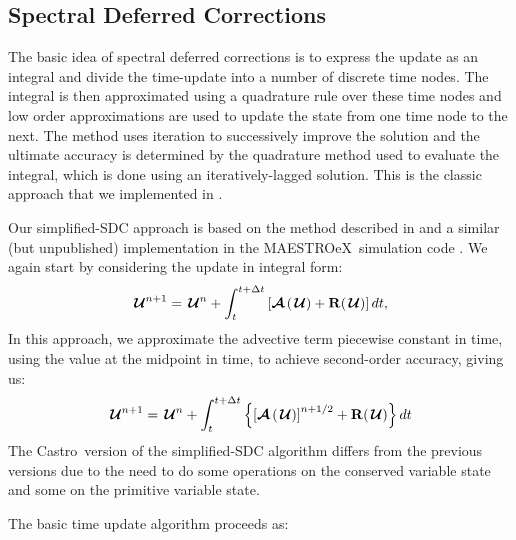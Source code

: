 \documentclass{aastex63}
\newcommand{\castro}{{\sf Castro}}
\newcommand{\maestroex}{{\sf MAESTROeX}}
\newcommand{\Uc}{{\,\bm{\mathcal{U}}}}
\newcommand{\Rb}{{\bf R}}
\newcommand{\Adv}[1]{{\left [\boldsymbol{\mathcal{A}} \left(#1\right)\right]}}
\newcommand{\Advs}[1]{\boldsymbol{\mathcal{A}} \left(#1\right)}
\newcommand{\MarginPar}[1]{\marginpar{\vskip-\baselineskip\raggedright\tiny\sffamily\hrule\smallskip{\color{red}#1}\par\smallskip\hrule}}
\begin{document}
\subsection{Spectral Deferred Corrections}

The basic idea of spectral deferred corrections \MarginPar{ref} is to express the
update as an integral and divide the time-update into a number of
discrete time nodes.  The integral is then approximated using a
quadrature rule over these time nodes and low order approximations are
used to update the state from one time node to the next.  The method
uses iteration to successively improve the solution and the ultimate
accuracy is determined by the quadrature method used to evaluate the
integral, which is done using an iteratively-lagged solution.  This is the
classic approach that we implemented in \cite{castro_sdc}.

Our simplified-SDC approach is based on the method described in \citet{SDC-old} and
a similar (but unpublished) implementation in the \maestroex\ simulation code \cite{maestroex}.
We again start by considering the update
in integral form:
\begin{equation}
\Uc^{n+1} = \Uc^n + \int_t^{t+\Delta t} \left [ \Advs{\Uc} + \Rb(\Uc) \right ] dt,
\end{equation}
In this approach, we 
approximate the advective term
piecewise constant in time, using the value at the midpoint in time,
to achieve second-order accuracy, giving us:
\begin{equation}
\label{eq:integral:simplesdc}
\Uc^{n+1} = \Uc^n + \int_t^{t+\Delta t} \left \{ \Adv{\Uc}^{n+1/2} + \Rb(\Uc) \right \} dt
\end{equation}
The \castro\ version of the simplified-SDC algorithm
differs from the previous versions due to the need to do some operations
on the conserved variable state and some on the primitive variable
state. 

The basic time update algorithm proceeds as:
\end{document}
